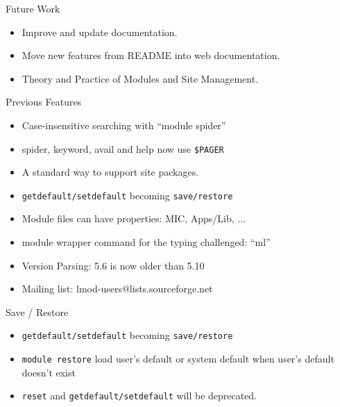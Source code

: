 \documentclass{beamer}
\begin{document}
\begin{frame}{Future Work}
  \begin{itemize}
    \item Improve and update documentation. 
    \item Move new features from README into web documentation.
    \item Theory and Practice of Modules and Site Management.
  \end{itemize}
\end{frame}





\begin{frame}{Previous Features}
  \begin{itemize}
    \item Case-insensitive searching with ``module spider''
    \item spider, keyword, avail and help now use \texttt{\$PAGER}
    \item A standard way to support site packages.
    \item \texttt{getdefault/setdefault} becoming \texttt{save/restore}
    \item Module files can have properties: MIC, Apps/Lib, ...
    \item module wrapper command for the typing challenged: ``ml''
    \item Version Parsing: 5.6 is now older than 5.10
    \item Mailing list: lmod-users@lists.sourceforge.net
  \end{itemize}
\end{frame}

\begin{frame}{Save / Restore}
  \begin{itemize}
    \item \texttt{getdefault/setdefault} becoming \texttt{save/restore}
    \item \texttt{module restore} load user's default or system
      default when user's default doesn't exist
    \item \texttt{reset} and \texttt{getdefault/setdefault} will be deprecated.
  \end{itemize}
\end{frame}
\end{document}
